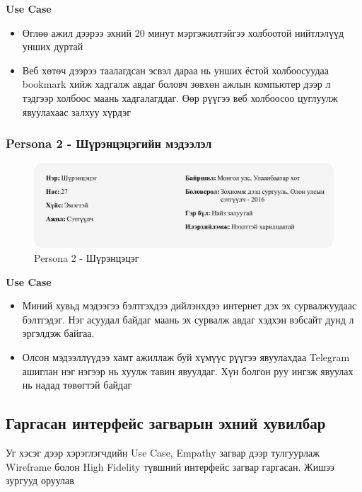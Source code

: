 \textbf{Use Case}

\begin{itemize}
	\item Өглөө ажил дээрээ эхний 20 минут мэргэжилтэйгээ холбоотой нийтлэлүүд унших дуртай
	\item Веб хөтөч дээрээ таалагдсан эсвэл дараа нь унших ёстой холбоосуудаа bookmark хийж хадгалж авдаг боловч зөвхөн ажлын компьютер дээр л тэдгээр холбоос маань хадгалагддаг. Өөр рүүгээ веб холбоосоо цуглуулж явуулахаас залхуу хүрдэг
\end{itemize}

\subsubsection{Persona 2 - Шүрэнцэцэгийн мэдээлэл}

\begin{figure}[h]
	\centering
	\includegraphics[width=15cm]{images/persona2-shurentsetseg.png}
	\caption{Persona 2 - Шүрэнцэцэг}
	\label{fig:persona1}
\end{figure}

\textbf{Use Case}

\begin{itemize}
	\item Миний хувьд мэдээгээ бэлтгэхдээ дийлэнхдээ интернет дэх эх сурвалжуудаас бэлтгэдэг. Нэг асуудал байдаг маань эх сурвалж авдаг хэдхэн вэбсайт дунд л эргэлдэж байгаа.
	\item Олсон мэдээллүүдээ хамт ажиллаж буй хүмүүс рүүгээ явуулахдаа Telegram ашиглан нэг нэгээр нь хуулж тавин явуулдаг. Хүн болгон руу ингэж явуулах нь надад төвөгтэй байдаг
\end{itemize}

\subsection{Гаргасан интерфейс загварын эхний хувилбар}

Уг хэсэг дээр хэрэглэгчдийн Use Case, Empathy загвар дээр тулгуурлаж Wireframe болон High Fidelity түвшний интерфейс загвар гаргасан. Жишээ зургууд оруулав

